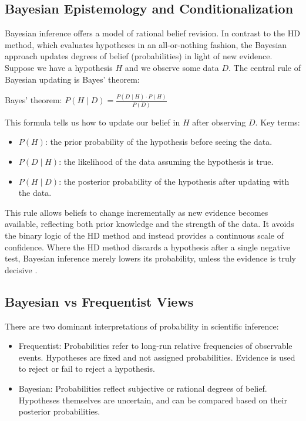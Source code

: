\documentclass[
  12pt,
]{book}
\providecommand{\tightlist}{%
  \setlength{\itemsep}{0pt}\setlength{\parskip}{0pt}}
\begin{document}
\subsection{Bayesian Epistemology and Conditionalization}\label{bayesian-epistemology-and-conditionalization}

Bayesian inference offers a model of rational belief revision. In contrast to the HD method, which evaluates hypotheses in an all-or-nothing fashion, the Bayesian approach updates degrees of belief (probabilities) in light of new evidence. Suppose we have a hypothesis \(H\) and we observe some data \(D\). The central rule of Bayesian updating is Bayes' theorem:

Bayes' theorem: \(P(H \mid D) = \frac{P(D \mid H) \cdot P(H)}{P(D)}\)

This formula tells us how to update our belief in \(H\) after observing \(D\). Key terms:

\begin{itemize}
\tightlist
\item
  \(P(H)\): the prior probability of the hypothesis before seeing the data.
\item
  \(P(D \mid H)\): the likelihood of the data assuming the hypothesis is true.
\item
  \(P(H \mid D)\): the posterior probability of the hypothesis after updating with the data.
\end{itemize}

This rule allows beliefs to change incrementally as new evidence becomes available, reflecting both prior knowledge and the strength of the data. It avoids the binary logic of the HD method and instead provides a continuous scale of confidence. Where the HD method discards a hypothesis after a single negative test, Bayesian inference merely lowers its probability, unless the evidence is truly decisive \citep{howson2006scientific}.

\subsection{Bayesian vs Frequentist Views}\label{bayesian-vs-frequentist-views}

There are two dominant interpretations of probability in scientific inference:

\begin{itemize}
\tightlist
\item
  Frequentist: Probabilities refer to long-run relative frequencies of observable events. Hypotheses are fixed and not assigned probabilities. Evidence is used to reject or fail to reject a hypothesis.
\item
  Bayesian: Probabilities reflect subjective or rational degrees of belief. Hypotheses themselves are uncertain, and can be compared based on their posterior probabilities.
\end{itemize}
\end{document}
